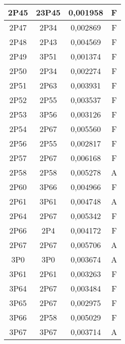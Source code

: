 \begin{center}
\begin{longtable}{|c|c|c|c|}
    \hline	2P45	&	23P45	&	0,001958	&	F	\\
    \hline	2P47	&	2P34	&	0,002869	&	F	\\
    \hline	2P48	&	2P43	&	0,004569	&	F	\\
    \hline	2P49	&	3P51	&	0,001374	&	F	\\
    \hline	2P50	&	2P34	&	0,002274	&	F	\\
    \hline	2P51	&	2P63	&	0,003931	&	F	\\
    \hline	2P52	&	2P55	&	0,003537	&	F	\\
    \hline	2P53	&	3P56	&	0,003126	&	F	\\
    \hline	2P54	&	2P67	&	0,005560	&	F	\\
    \hline	2P56	&	2P55	&	0,002817	&	F	\\
    \hline	2P57	&	2P67	&	0,006168	&	F	\\
    \hline	2P58	&	2P58	&	0,005278	&	A	\\
    \hline	2P60	&	3P66	&	0,004966	&	F	\\
    \hline	2P61	&	3P61	&	0,004748	&	A	\\
    \hline	2P64	&	2P67	&	0,005342	&	F	\\
    \hline	2P66	&	2P4	&	0,004172	&	F	\\
    \hline	2P67	&	2P67	&	0,005706	&	A	\\
    \hline	3P0	&	3P0	&	0,003674	&	A	\\
    \hline	3P61	&	2P61	&	0,003263	&	F	\\
    \hline	3P64	&	2P67	&	0,003484	&	F	\\
    \hline	3P65	&	2P67	&	0,002975	&	F	\\
    \hline	3P66	&	2P58	&	0,005029	&	F	\\
    \hline	3P67	&	3P67	&	0,003714	&	A	\\
	\end{longtable}
\end{center}



